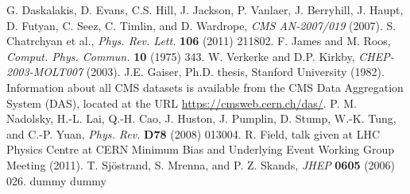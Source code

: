 \documentclass[12pt, letterpaper]{report}
\begin{document}
\begin{thebibliography}{99}
 G. Daskalakis, D. Evans, C.S. Hill, J. Jackson, P. Vanlaer, J. Berryhill, J. Haupt, D. Futyan, C. Seez, C. Timlin, and D. Wardrope, \textit{CMS AN-2007/019} (2007).
 S. Chatrchyan et al., \textit{Phys. Rev. Lett.} \textbf{106} (2011) 211802.
 F. James and M. Roos, \textit{Comput. Phys. Commun.} \textbf{10} (1975) 343.
 W. Verkerke and D.P. Kirkby, \textit{CHEP-2003-MOLT007} (2003).
 J.E. Gaiser, Ph.D. thesis, Stanford University (1982).
 Information about all CMS datasets is available from the CMS Data Aggregation System (DAS), located at the URL \url{https://cmsweb.cern.ch/das/}.
 P. M. Nadolsky, H.-L. Lai, Q.-H. Cao, J. Huston, J. Pumplin, D. Stump, W.-K. Tung, and C.-P. Yuan, \textit{Phys. Rev.} \textbf{D78} (2008) 013004.
 R. Field, talk given at LHC Physics Centre at CERN Minimum Bias and Underlying Event Working Group Meeting (2011).
 T. Sj\"ostrand, S. Mrenna, and P. Z. Skands, \textit{JHEP} \textbf{0605} (2006) 026.
 dummy
 dummy
\end{thebibliography}
\end{document}
